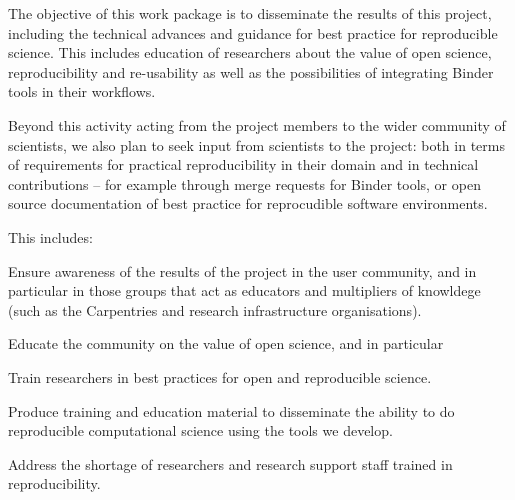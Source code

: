 \begin{workpackage}[id=education,wphases=0-36,swsites,
  title=Education and Dissemination,
  short=Education,
  lead=IFR,
  IFRRM=10,
  MPRM=6,
  SRLRM=7,
  QSRM=3,
  UIORM=9
]
\begin{wpobjectives}
  The objective of this work package is to disseminate the results of this
  project, including the technical advances and guidance for best practice for
  reproducible science. This includes education of researchers about the value of
  open science, reproducibility and re-usability as well as the possibilities of
  integrating Binder tools in their workflows.

  Beyond this activity acting from the project members to the wider community of
  scientists, we also plan to seek input from scientists to the project: both in
  terms of requirements for practical reproducibility in their domain and in
  technical contributions -- for example through merge requests for Binder
  tools, or open source documentation of best practice for reprocudible software
  environments.

  This includes:
 \begin{compactitem}
   \item Ensure awareness of the results of the project in the user community,
     and in particular in those groups that act as educators and multipliers of
     knowldege (such as the Carpentries and research infrastructure organisations).
   \item Educate the community on the value of open science, and in particular
   \item Train researchers in best practices for open and reproducible science.
   \item Produce training and education material to disseminate the ability to
     do reproducible computational science using the tools we develop.
   \item Address the shortage of researchers and research support staff trained in reproducibility.
     \item {}
 \end{compactitem}
\end{wpobjectives}



\end{workpackage}
